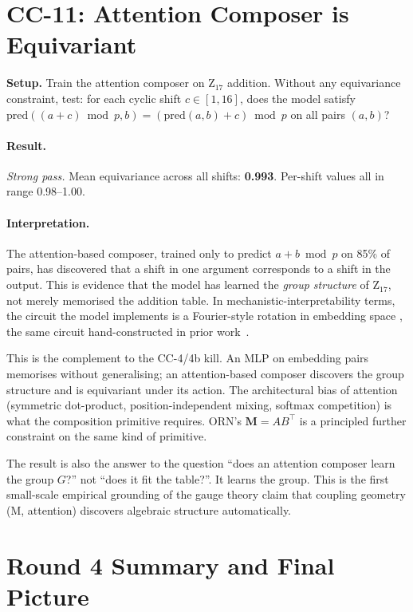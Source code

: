 \documentclass[10pt, twocolumn, a4paper]{article}
\newcommand{\M}{\mathbf{M}}
\begin{document}
\section{CC-11: Attention Composer is Equivariant}

\textbf{Setup.} Train the attention composer on Z$_{17}$ addition. Without any equivariance constraint, test: for each cyclic shift $c \in [1, 16]$, does the model satisfy $\mathrm{pred}((a+c) \bmod p, b) = (\mathrm{pred}(a, b) + c) \bmod p$ on all pairs $(a, b)$?

\paragraph{Result.} \emph{Strong pass.} Mean equivariance across all shifts: \textbf{0.993}. Per-shift values all in range 0.98--1.00.

\paragraph{Interpretation.} The attention-based composer, trained only to predict $a + b \bmod p$ on 85\% of pairs, has discovered that a shift in one argument corresponds to a shift in the output. This is evidence that the model has learned the \emph{group structure} of Z$_{17}$, not merely memorised the addition table. In mechanistic-interpretability terms, the circuit the model implements is a Fourier-style rotation in embedding space ,  the same circuit hand-constructed in prior work~\cite{nanda2023progress}.

This is the complement to the CC-4/4b kill. An MLP on embedding pairs memorises without generalising; an attention-based composer discovers the group structure and is equivariant under its action. The architectural bias of attention (symmetric dot-product, position-independent mixing, softmax competition) is what the composition primitive requires. ORN's $\M = AB^\top$ is a principled further constraint on the same kind of primitive.

The result is also the answer to the question ``does an attention composer learn the group $G$?'' not ``does it fit the table?''. It learns the group. This is the first small-scale empirical grounding of the gauge theory claim that coupling geometry (M, attention) discovers algebraic structure automatically.


\section{Round 4 Summary and Final Picture}
\end{document}
